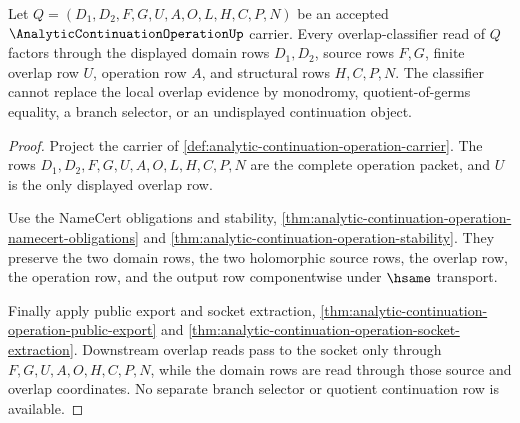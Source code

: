\begin{theorem}
\label{thm:analytic-continuation-operation-overlap-classifier-exactness}
Let $Q=(D_1,D_2,F,G,U,A,O,L,H,C,P,N)$ be an accepted $\AnalyticContinuationOperationUp$ carrier. Every overlap-classifier read of $Q$ factors through the displayed domain rows $D_1,D_2$, source rows $F,G$, finite overlap row $U$, operation row $A$, and structural rows $H,C,P,N$. The classifier cannot replace the local overlap evidence by monodromy, quotient-of-germs equality, a branch selector, or an undisplayed continuation object.
\end{theorem}
\begin{proof}
Project the carrier of \autoref{def:analytic-continuation-operation-carrier}. The rows $D_1,D_2,F,G,U,A,O,L,H,C,P,N$ are the complete operation packet, and $U$ is the only displayed overlap row.

Use the NameCert obligations and stability, \autoref{thm:analytic-continuation-operation-namecert-obligations} and \autoref{thm:analytic-continuation-operation-stability}. They preserve the two domain rows, the two holomorphic source rows, the overlap row, the operation row, and the output row componentwise under $\hsame$ transport.

Finally apply public export and socket extraction, \autoref{thm:analytic-continuation-operation-public-export} and \autoref{thm:analytic-continuation-operation-socket-extraction}. Downstream overlap reads pass to the socket only through $F,G,U,A,O,H,C,P,N$, while the domain rows are read through those source and overlap coordinates. No separate branch selector or quotient continuation row is available.
\end{proof}

